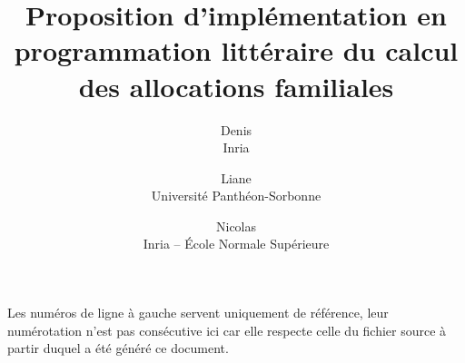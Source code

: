 \documentclass[11pt, french, a4paper]{article}
\title{
  Proposition d'implémentation en programmation
  littéraire du calcul des allocations familiales
}
\author{
  Denis \bsc{Merigoux}\\Inria\and
  Liane \bsc{Huttner}\\Université Panthéon-Sorbonne\and
  Nicolas \bsc{Chataing}\\Inria -- École Normale Supérieure\and
}
\begin{document}
\maketitle

Les numéros de ligne à gauche servent uniquement de référence, leur numérotation
n'est pas consécutive ici car elle respecte celle du fichier source à partir
duquel a été généré ce document.


\end{document}
